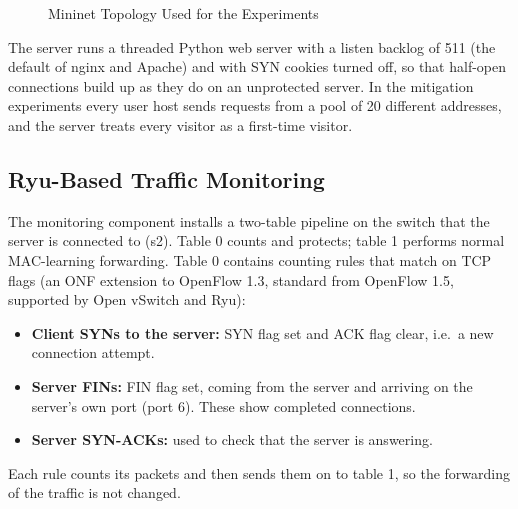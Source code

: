\documentclass[12pt,a4paper]{article}
\begin{document}
\begin{figure}[H]
\centering
{}
\caption{Mininet Topology Used for the Experiments}
\label{fig:topo}
\end{figure}

The server runs a threaded Python web server with a listen backlog of 511 (the
default of nginx and Apache) and with SYN cookies turned off, so that half-open
connections build up as they do on an unprotected server. In the mitigation
experiments every user host sends requests from a pool of 20 different
addresses, and the server treats every visitor as a first-time visitor.

\subsection{Ryu-Based Traffic Monitoring}
The monitoring component installs a two-table pipeline on the switch that the
server is connected to (s2). Table 0 counts and protects; table 1 performs
normal MAC-learning forwarding. Table 0 contains counting rules that match on
TCP flags (an ONF extension to OpenFlow 1.3, standard from OpenFlow 1.5,
supported by Open vSwitch and Ryu):
\begin{itemize}
  \item \textbf{Client SYNs to the server:} SYN flag set and ACK flag clear,
  i.e.\ a new connection attempt.
  \item \textbf{Server FINs:} FIN flag set, coming from the server and arriving
  on the server's own port (port 6). These show completed connections.
  \item \textbf{Server SYN-ACKs:} used to check that the server is answering.
\end{itemize}
Each rule counts its packets and then sends them on to table 1, so the
forwarding of the traffic is not changed.
\end{document}

